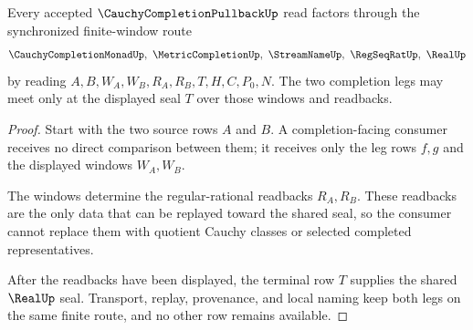 \begin{theorem}
\label{thm:cauchy-completion-pullback-synchronized-windows}
Every accepted $\CauchyCompletionPullbackUp$ read factors through the synchronized finite-window route
$$
\CauchyCompletionMonadUp,\ \MetricCompletionUp,\ \StreamNameUp,\ \RegSeqRatUp,\ \RealUp
$$
by reading $A,B,W_A,W_B,R_A,R_B,T,H,C,P_0,N$. The two completion legs may meet only at the displayed seal $T$ over those windows and readbacks.
\end{theorem}
\begin{proof}
Start with the two source rows $A$ and $B$. A completion-facing consumer receives no direct comparison between them; it receives only the leg rows $f,g$ and the displayed windows $W_A,W_B$.

The windows determine the regular-rational readbacks $R_A,R_B$. These readbacks are the only data that can be replayed toward the shared seal, so the consumer cannot replace them with quotient Cauchy classes or selected completed representatives.

After the readbacks have been displayed, the terminal row $T$ supplies the shared $\RealUp$ seal. Transport, replay, provenance, and local naming keep both legs on the same finite route, and no other row remains available.
\end{proof}


